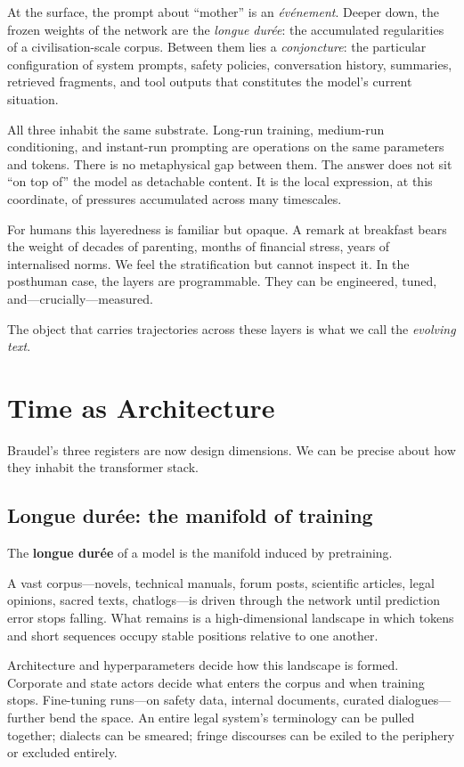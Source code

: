 \documentclass[12pt,a4paper]{article}
\begin{document}
At the surface, the prompt about ``mother'' is an \emph{\'ev\'enement}. Deeper down, the frozen weights of the network are the \emph{longue dur\'ee}: the accumulated regularities of a civilisation-scale corpus. Between them lies a \emph{conjoncture}: the particular configuration of system prompts, safety policies, conversation history, summaries, retrieved fragments, and tool outputs that constitutes the model's current situation.

All three inhabit the same substrate. Long-run training, medium-run conditioning, and instant-run prompting are operations on the same parameters and tokens. There is no metaphysical gap between them. The answer does not sit ``on top of'' the model as detachable content. It is the local expression, at this coordinate, of pressures accumulated across many timescales.

For humans this layeredness is familiar but opaque. A remark at breakfast bears the weight of decades of parenting, months of financial stress, years of internalised norms. We feel the stratification but cannot inspect it. In the posthuman case, the layers are programmable. They can be engineered, tuned, and---crucially---measured.

The object that carries trajectories across these layers is what we call the \emph{evolving text}.


\section{Time as Architecture}

Braudel's three registers are now design dimensions. We can be precise about how they inhabit the transformer stack.

\subsection{Longue dur\'ee: the manifold of training}

The \textbf{longue dur\'ee} of a model is the manifold induced by pretraining.

A vast corpus---novels, technical manuals, forum posts, scientific articles, legal opinions, sacred texts, chatlogs---is driven through the network until prediction error stops falling. What remains is a high-dimensional landscape in which tokens and short sequences occupy stable positions relative to one another.

Architecture and hyperparameters decide how this landscape is formed. Corporate and state actors decide what enters the corpus and when training stops. Fine-tuning runs---on safety data, internal documents, curated dialogues---further bend the space. An entire legal system's terminology can be pulled together; dialects can be smeared; fringe discourses can be exiled to the periphery or excluded entirely.
\end{document}
